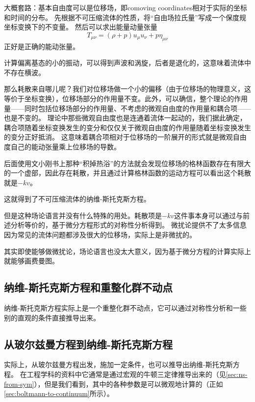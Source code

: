 \cite{eft-fluid-rel}
大概套路：基本自由度可以是位移场，即comoving coordinates相对于实际的坐标和时间的分布。
先根据不可压缩流体的性质，将“自由场拉氏量”写成一个保度规坐标变换下的不变量。
然后可以求出能量动量张量
\begin{equation}
    T_{\mu \nu} = (\rho + p) u_\mu u_\nu + p \eta_{\mu \nu}
\end{equation}
正好是正确的能动张量。

计算偏离基态的小的振动，可以得到声波和涡旋，后者是退化的，这意味着流体中不存在横波。

那么耗散来自哪儿呢？我们对位移场做一个小的偏移（由于位移场的物理意义，这等价于坐标变换），位移场部分的作用量不变。此外，可以确信，整个理论的作用量——同时包括位移场部分的作用量、不考虑的微观自由度的作用量和耦合项——也是不变的。
理论中那些微观自由度也是连通着流体一起动的，我们据此确定，耦合项随着坐标变换发生的变分和仅仅关于微观自由度的作用量随着坐标变换发生的变分正好抵消。
这意味着耦合项相对于位移场的一阶展开的形式就是微观自由度自己的能动张量乘上位移场的导数。

后面使用文小刚书上那种“积掉热浴”的方法就会发现位移场的格林函数存在有限大的一个虚部，因此存在耗散，并且通过计算格林函数的运动方程可以看出这个耗散就是$-k v$。

这就得到了不可压缩流体的纳维-斯托克斯方程。

但是这种场论语言并没有什么特殊的用处。耗散项是$-kv$这件事本身可以通过与前述分析等价的，基于微分方程形式的对称性分析得到。
微扰论提供不了太多信息因为常见的流体问题都涉及很大的位移场，实际上是非微扰的。

其实即使能够做微扰论，场论语言也没太大意义，因为基于微分方程的计算实际上就能够画费曼图。

\subsection{纳维-斯托克斯方程和重整化群不动点}

纳维-斯托克斯方程实际上是一个重整化群不动点，它可以通过对称性分析和一些别的直观的条件直接推导出来\cite{Visscher_1985}。

\subsection{从玻尔兹曼方程到纳维-斯托克斯方程}\label{sec:from-boltmann-to-ns}

实际上，从玻尔兹曼方程出发，施加一定条件，也可以推导出纳维-斯托克斯方程。
在工程学科的资料中它通常是通过宏观的牛顿三定律推导出来的（见\autoref{sec:ns-from-sym}），但是我们看到，其中的各种参数是可以微观地计算的（正如\autoref{sec:boltmann-to-continuum}所示）。

